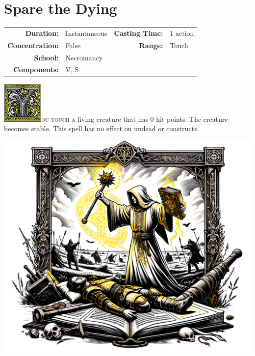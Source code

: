 \documentclass[12pt,showtrims]{memoir}
\begin{document}
\newpage
\section*{Spare the Dying}

{
\small\centering\vspace{-6pt}
\begin{tabular}{rlrl}
\toprule

\textbf{Duration:} & Instantaneous &
\textbf{Casting Time:} & 1 action \\
\textbf{Concentration:} & False &
\textbf{Range:} & Touch \\
\textbf{School:} & Necromancy \\
\textbf{Components:} & \multicolumn{3}{p{0.7\textwidth}}{V, S}\\

\bottomrule
\end{tabular}
}

\vspace{1\baselineskip}\noindent 
\lettrine[lines=4]{\includegraphics[height=58pt]{initials/Y.png}}{ou touch a} living creature that has 0 hit points. The creature becomes stable. This spell has no effect on undead or constructs.

\vfill
{
\centering
\includegraphics[width=1\textwidth]{spell_artwork/spare_the_dying.png}
}
\end{document}
